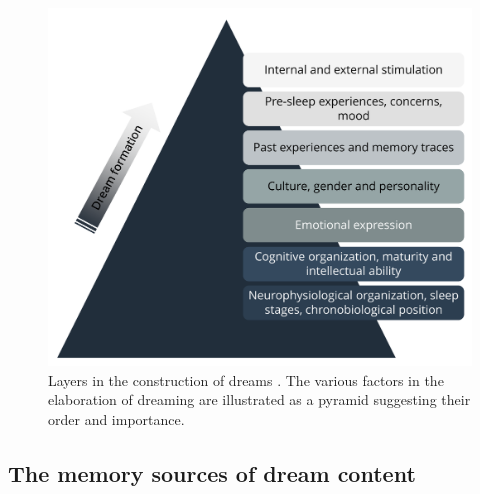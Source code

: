 \begin{figure}[htb]
	\includegraphics[width=\textwidth]{Fig/Intro/Intro_Pyramid_dream_construction/Intro_pyramid_dream.png}
	\caption[Layers in the construction of dreams]{Layers in the construction of dreams \citep{de_koninck_sleep_2012}. The various factors in the elaboration of dreaming are illustrated as a pyramid suggesting their order and importance.}
	\label{fig:intro:koninck}
\end{figure}

\subsection{The memory sources of dream content}
\label{sec:dream-content:sources:memory}


